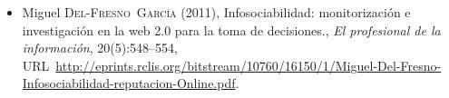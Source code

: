 \documentclass[12pt,a4paper,oneside,notitlepage]{article}
\newcommand{\urlprefix}{URL~}
\begin{document}
\begin{itemize}
\begin{itemize}
\item
Miguel \textsc{Del-Fresno~Garc\'{\i}a} (2011), Infosociabilidad:
  monitorizaci\'{o}n e investigaci\'{o}n en la web 2.0 para la toma de
  decisiones., \emph{El profesional de la informaci\'{o}n}, 20(5):548--554,
  \urlprefix\url{http://eprints.rclis.org/bitstream/10760/16150/1/Miguel-Del-Fresno-Infosociabilidad-reputacion-Online.pdf}.
\end{itemize}

\end{itemize}
\end{document}
